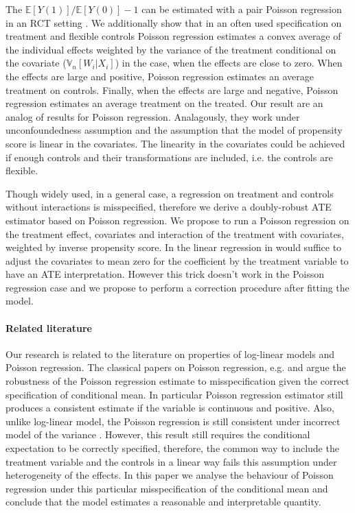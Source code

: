 \documentclass[a4paper,12pt]{article}
\theoremstyle{plain}
\begin{document}
The $\mathbb{E}[Y(1)]/\mathbb{E}[Y(0)] - 1$ can be estimated with a pair Poisson regression in an RCT setting \citep{cohn2022count, chen2022log}. We additionally show that in an often used specification on treatment and flexible controls Poisson regression estimates a convex average of the individual effects weighted by the variance of the treatment conditional on the covariate ($\mathbb{V}_n[W_i | X_i]$) in the case, when the effects are close to zero. When the effects are large and positive, Poisson regression estimates an average treatment on controls. Finally, when the effects are large and negative, Poisson regression estimates an average treatment on the treated. Our result are an analog of \cite{angrist1998} results for Poisson regression. Analagously, they work under unconfoundedness assumption and the assumption that the model of propensity score is linear in the covariates. The linearity in the covariates could be achieved if enough controls and their transformations are included, i.e. the controls are flexible. 

Though widely used, in a general case, a regression on treatment and controls without interactions is misspecified, therefore we derive a doubly-robust ATE estimator based on Poisson regression. We propose to run a Poisson regression on the treatment effect, covariates and interaction of the treatment with covariates, weighted by inverse propensity score. In the linear regression in would suffice to adjust the covariates to mean zero for the coefficient by the treatment variable to have an ATE interpretation. However this trick doesn't work in the Poisson regression case and we propose to perform a correction procedure after fitting the model. 

\paragraph{Related literature}
Our research is related to the literature on properties of log-linear models and Poisson regression. The classical papers on Poisson regression, e.g. \cite{gourieroux1984pseudo} and \citet[Chapter 18.2]{wooldridge2010econometric}
argue the robustness of the Poisson regression estimate to misspecification given the correct specification of conditional mean. In particular Poisson regression estimator still produces a consistent estimate if the variable is continuous and positive. Also, unlike log-linear model, the Poisson regression is still consistent under incorrect model of the variance \cite{silva2006log}. However, this result still requires the conditional expectation to be correctly specified, therefore, the common way to include the treatment variable and the controls in a linear way fails this assumption under heterogeneity of the effects. In this paper we analyse the behaviour of Poisson regression under this particular misspecification of the conditional mean and conclude that the model estimates a reasonable and interpretable quantity.
\end{document}
